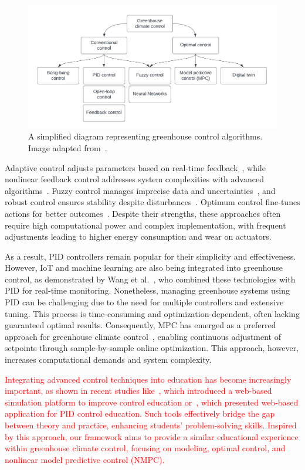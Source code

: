 \documentclass[conference]{IEEEtran}
\begin{document}
\begin{figure}
	\centering
	\includegraphics[width=.5\textwidth]{images/flowchart.pdf}
	\caption{A simplified diagram representing greenhouse control algorithms. Image adapted from~\cite{Trepanier2024}.}\label{fig:flowchart}
\end{figure}

Adaptive control adjusts parameters based on real-time feedback~\cite{Tian2022}, while nonlinear feedback control addresses system complexities with advanced algorithms~\cite{Bood2023}. Fuzzy control manages imprecise data and uncertainties~\cite{smartcities7030055}, and robust control ensures stability despite disturbances~\cite{Zhang2021}. Optimum control fine-tunes actions for better outcomes~\cite{Debroy2024, SVENSEN2024108578}. Despite their strengths, these approaches often require high computational power and complex implementation, with frequent adjustments leading to higher energy consumption and wear on actuators.

As a result, PID controllers remain popular for their simplicity and effectiveness. However, IoT and machine learning are also being integrated into greenhouse control, as demonstrated by Wang et al.~\cite{Wang2024}, who combined these technologies with PID for real-time monitoring. Nonetheless, managing greenhouse systems using PID can be challenging due to the need for multiple controllers and extensive tuning. This process is time-consuming and optimization-dependent, often lacking guaranteed optimal results. Consequently, MPC has emerged as a preferred approach for greenhouse climate control~\cite{Hu2022}, enabling continuous adjustment of setpoints through sample-by-sample online optimization. This approach, however, increases computational demands and system complexity.

\textcolor{red}{Integrating advanced control techniques into education has become increasingly important, as shown in recent studies like~\cite{WangEducation2024}, which introduced a web-based simulation platform to improve control education or~\cite{Zakova2024}, which presented web-based application for PID control education. Such tools effectively bridge the gap between theory and practice, enhancing students' problem-solving skills. Inspired by this approach, our framework aims to provide a similar educational experience within greenhouse climate control, focusing on modeling, optimal control, and nonlinear model predictive control (NMPC).}
\end{document}
